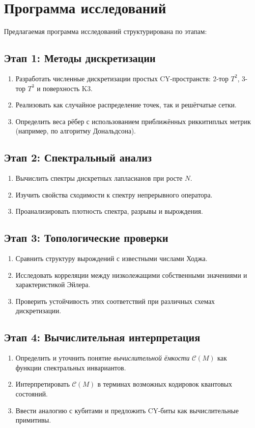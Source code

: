 \documentclass[12pt,a4paper]{article}
\begin{document}
\section{Программа исследований}
Предлагаемая программа исследований структурирована по этапам:

\subsection{Этап 1: Методы дискретизации}
\begin{enumerate}
\item Разработать численные дискретизации простых CY-пространств: 
2-тор $T^2$, 3-тор $T^3$ и поверхность K3.  
\item Реализовать как случайное распределение точек, так и решётчатые сетки.  
\item Определить веса рёбер с использованием приближённых риккитиплых метрик 
(например, по алгоритму Дональдсона).  
\end{enumerate}

\subsection{Этап 2: Спектральный анализ}
\begin{enumerate}
\item Вычислить спектры дискретных лапласианов при росте $N$.  
\item Изучить свойства сходимости к спектру непрерывного оператора.  
\item Проанализировать плотность спектра, разрывы и вырождения.  
\end{enumerate}

\subsection{Этап 3: Топологические проверки}
\begin{enumerate}
\item Сравнить структуру вырождений с известными числами Ходжа.  
\item Исследовать корреляции между низколежащими собственными значениями 
и характеристикой Эйлера.  
\item Проверить устойчивость этих соответствий 
при различных схемах дискретизации.  
\end{enumerate}

\subsection{Этап 4: Вычислительная интерпретация}
\begin{enumerate}
\item Определить и уточнить понятие \emph{вычислительной ёмкости} $\mathcal{C}(M)$ 
как функции спектральных инвариантов.  
\item Интерпретировать $\mathcal{C}(M)$ в терминах возможных кодировок квантовых состояний.  
\item Ввести аналогию с кубитами и предложить CY-биты 
как вычислительные примитивы.  
\end{enumerate}
\end{document}
